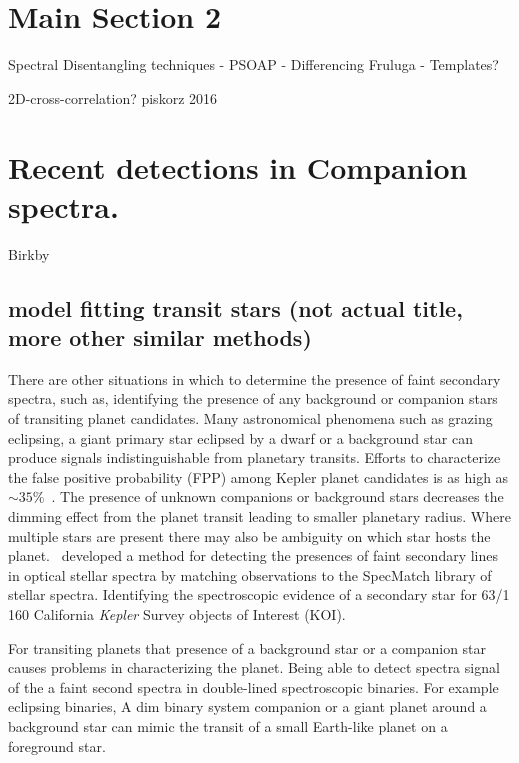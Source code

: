 
\section{Main Section 2}


Spectral Disentangling techniques
- PSOAP
- Differencing Fruluga
- Templates?


2D-cross-correlation?   piskorz 2016


\section{Recent detections in Companion spectra.}


Birkby


\subsection{model fitting transit stars (not actual title, more other similar methods)}
There are other situations in which to determine the presence of faint secondary spectra, such as, identifying the presence of any background or companion stars of transiting planet candidates. Many astronomical phenomena such as grazing eclipsing, a giant primary star eclipsed by a dwarf or a background star can produce signals indistinguishable from planetary transits. Efforts to characterize the false positive probability (FPP) among Kepler planet candidates is as high as $\sim35\%$~\citep{santerne_sophie_2012}. The presence of unknown companions or background stars decreases the dimming effect from the planet transit leading to smaller planetary radius. Where multiple stars are present there may also be ambiguity on which star hosts the planet.~\citet{kolbl_detection_2015} developed a method for detecting the presences of faint secondary lines in optical stellar spectra by matching observations to the SpecMatch library of stellar spectra. Identifying the spectroscopic evidence of a secondary star for 63/1\,160 California \emph{Kepler} Survey objects of Interest (KOI).


For transiting planets that presence of a background star or a companion star causes problems in characterizing the planet. Being able to detect spectra signal of the a faint second spectra in double-lined spectroscopic binaries.
For example eclipsing binaries,
A dim binary system companion or a giant planet around a background star can mimic the transit of a small Earth-like planet on a foreground star.






